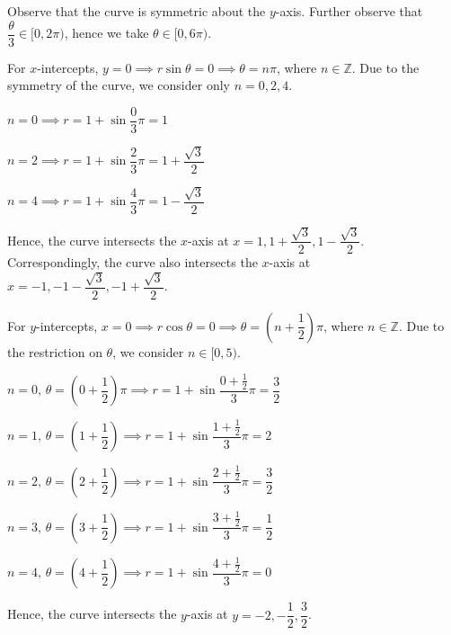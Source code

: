 \documentclass{jhwhw}
\begin{document}
    \solution
        Observe that the curve is symmetric about the $y$-axis. Further observe that $\dfrac\theta3 \in [0, 2\pi)$, hence we take $\theta \in [0, 6\pi)$.
        
        For $x$-intercepts, $y = 0 \implies r\sin\theta = 0 \implies \theta = n\pi$, where $n \in \mathbb{Z}$. Due to the symmetry of the curve, we consider only $n = 0, 2, 4$.

         $n = 0 \implies r = 1 + \sin\dfrac03\pi = 1$
        
        \medskip

         $n = 2 \implies r = 1 + \sin\dfrac23\pi = 1 + \dfrac{\sqrt3}2$
        
        \medskip
        
         $n = 4 \implies r = 1 + \sin\dfrac43\pi = 1 - \dfrac{\sqrt3}2$

        Hence, the curve intersects the $x$-axis at $x = 1, 1 + \dfrac{\sqrt3}2, 1 - \dfrac{\sqrt3}2$. Correspondingly, the curve also intersects the $x$-axis at $x = -1, -1 - \dfrac{\sqrt3}2, -1 + \dfrac{\sqrt3}2$. 

        For $y$-intercepts, $x = 0 \implies r\cos\theta = 0 \implies \theta = \left(n + \dfrac12\right)\pi$, where $n \in \mathbb{Z}$. Due to the restriction on $\theta$, we consider $n \in [0, 5)$.

         $n = 0, \, \theta=\left(0 + \dfrac12\right)\pi \implies r = 1 + \sin\dfrac{0 + \frac12}3\pi = \dfrac32$

        \medskip

         $n = 1, \, \theta=\left(1 + \dfrac12\right)\implies r = 1 + \sin\dfrac{1 + \frac12}3\pi = 2$

        \medskip

         $n = 2, \, \theta=\left(2 + \dfrac12\right)\implies r = 1 + \sin\dfrac{2 + \frac12}3\pi = \dfrac32$

        \medskip

         $n = 3, \, \theta=\left(3 + \dfrac12\right)\implies r = 1 + \sin\dfrac{3 + \frac12}3\pi = \dfrac12$

        \medskip

         $n = 4, \, \theta=\left(4 + \dfrac12\right)\implies r = 1 + \sin\dfrac{4 + \frac12}3\pi = 0$

        Hence, the curve intersects the $y$-axis at $y = -2, -\dfrac12, \dfrac32$.
        
\end{document}
